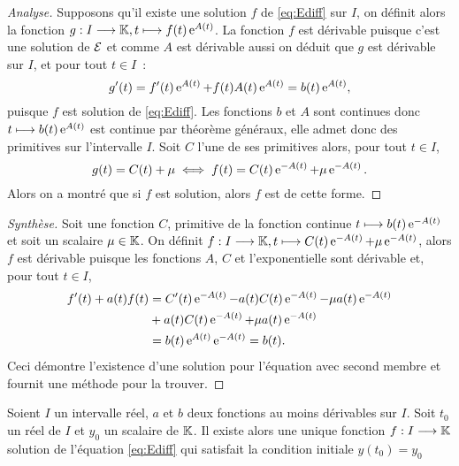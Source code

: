 \begin{proof}[Analyse]
  Supposons qu'il existe une solution \(f\) de \eqref{eq:Ediff} sur \(I\), on
  définit alors la fonction \(g:I \longrightarrow{} \mathbb{K}, t \longmapsto{} f(t)\operatorname{e}^{A(t)}\). La
  fonction \(f\) est dérivable puisque c'est une solution de \(\mathcal{E}\) et comme
  \(A\) est dérivable aussi on déduit que \(g\) est dérivable sur \(I\), et
  pour tout \(t \in I\)~:
  \begin{equation}
    g'(t) = f'(t)\operatorname{e}^{A(t)} + f(t)A(t)\operatorname{e}^{A(t)} = b(t)\operatorname{e}^{A(t)},
  \end{equation}
  puisque \(f\) est solution de \eqref{eq:Ediff}. Les fonctions \(b\) et \(A\)
  sont continues donc \(t \longmapsto b(t)\operatorname{e}^{A(t)}\) est continue par
  théorème généraux, elle admet donc des primitives sur l'intervalle \(I\).
  Soit \(C\) l'une de ses primitives alors, pour tout \(t \in I\),
  \begin{equation}
    g(t) = C(t) + \mu \iff f(t) = C(t)\operatorname{e}^{-A(t)} + \mu \operatorname{e}^{-A(t)}.
  \end{equation}
  Alors on a montré que si \(f\) est solution, alors \(f\) est de cette forme.
\end{proof}

\begin{proof}[Synthèse]
  Soit une fonction \(C\), primitive de la fonction continue \(t \longmapsto
  b(t)\operatorname{e}^{-A(t)}\) et soit un scalaire \(\mu \in \mathbb{K}\). On définit
  \(f:I \longrightarrow{} \mathbb{K}, t \longmapsto{} C(t)\operatorname{e}^{-A(t)} + \mu \operatorname{e}^{-A(t)}\), alors \(f\) est
  dérivable puisque les fonctions \(A\), \(C\) et l'exponentielle sont
  dérivable et, pour tout \(t \in I\),
  \begin{align}
    f'(t) + a(t)f(t)& = C'(t) \operatorname{e}^{-A(t)} -a(t)C(t)\operatorname{e}^{-A(t)}-\mu a(t) \operatorname{e}^{-A(t)}
    \notag \\
                    &+ a(t)C(t)\operatorname{e}^{-A(t)} + \mu a(t) \operatorname{e}^{-A(t)}\\
                    &= b(t) \operatorname{e}^{A(t)} \operatorname{e}^{-A(t)} = b(t).
  \end{align}
  Ceci démontre l'existence d'une solution pour l'équation avec second membre
  et fournit une méthode pour la trouver.
\end{proof}

\begin{theo}
  \label{theo:4}
  Soient \(I\) un intervalle réel, \(a\) et \(b\) deux fonctions au moins
  dérivables sur \(I\). Soit \(t_0\) un réel de \(I\) et \(y_0\) un scalaire
  de \(\mathbb{K}\). Il existe alors une unique fonction \(f:I \longrightarrow{} \mathbb{K}\)
  solution de l'équation \eqref{eq:Ediff} qui satisfait la condition initiale
  \(y(t_0) = y_0\)
\end{theo}

